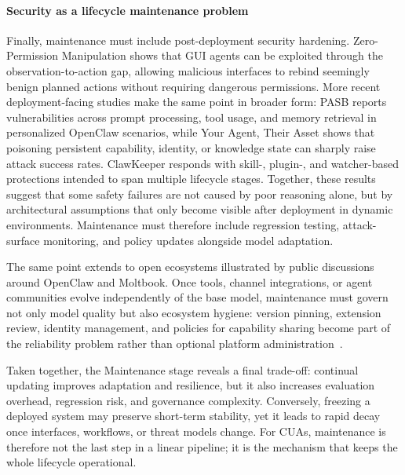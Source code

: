 \paragraph{Security as a lifecycle maintenance problem}
Finally, maintenance must include post-deployment security hardening. Zero-Permission Manipulation \cite{qian2026zero} shows that GUI agents can be exploited through the observation-to-action gap, allowing malicious interfaces to rebind seemingly benign planned actions without requiring dangerous permissions. More recent deployment-facing studies make the same point in broader form: PASB \cite{wang2026pasb} reports vulnerabilities across prompt processing, tool usage, and memory retrieval in personalized OpenClaw scenarios, while Your Agent, Their Asset \cite{wang2026asset} shows that poisoning persistent capability, identity, or knowledge state can sharply raise attack success rates. ClawKeeper \cite{liu2026clawkeeper} responds with skill-, plugin-, and watcher-based protections intended to span multiple lifecycle stages. Together, these results suggest that some safety failures are not caused by poor reasoning alone, but by architectural assumptions that only become visible after deployment in dynamic environments. Maintenance must therefore include regression testing, attack-surface monitoring, and policy updates alongside model adaptation.

The same point extends to open ecosystems illustrated by public discussions around OpenClaw and Moltbook. Once tools, channel integrations, or agent communities evolve independently of the base model, maintenance must govern not only model quality but also ecosystem hygiene: version pinning, extension review, identity management, and policies for capability sharing become part of the reliability problem rather than optional platform administration~\cite{wang2026asset,liu2026clawkeeper}.

Taken together, the Maintenance stage reveals a final trade-off: continual updating improves adaptation and resilience, but it also increases evaluation overhead, regression risk, and governance complexity. Conversely, freezing a deployed system may preserve short-term stability, yet it leads to rapid decay once interfaces, workflows, or threat models change. For CUAs, maintenance is therefore not the last step in a linear pipeline; it is the mechanism that keeps the whole lifecycle operational.


